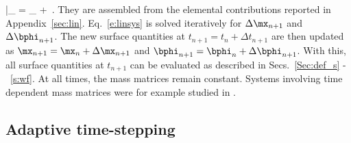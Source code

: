\documentclass[11pt]{article}
\begin{document}
%
\bar\mK_\phi \is \ds {} = \alpha_\mrf {} +  \,.
\label{e:tan_m}
\eqe
They are assembled from the elemental contributions reported in Appendix~\ref{sec:lin}. 
Eq.~\eqref{e:linsys} is solved iteratively for $\Delta \mx_{n+1}$ and $\Delta\bphi_{n+1}$. The new surface quantities at $t_{n+1} = t_n + \Delta t_{n+1}$ are then updated as $\mx_{n+1} = \mx_n+\Delta \mx_{n+1}$ and $\bphi_{n+1} = \bphi_n+\Delta \bphi_{n+1}$.
With this, all surface quantities at $t_{n+1}$ can be evaluated as described in Secs.~\ref{Sec:def_s} -~\ref{s:wf}.
At all times, the mass matrices remain constant. 
Systems involving time dependent mass matrices were for example studied in \citet{lubich13}.


\subsection{Adaptive time-stepping}\label{Sec:ATS}
\end{document}
